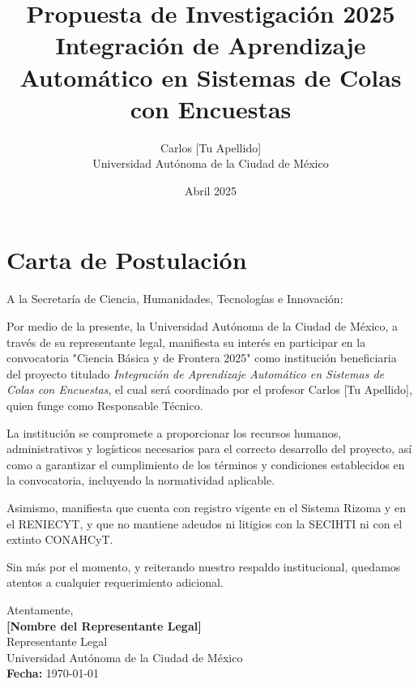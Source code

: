 \documentclass[12pt]{article}
\title{Propuesta de Investigación 2025\\Integración de Aprendizaje Automático en Sistemas de Colas con Encuestas}
\author{Carlos [Tu Apellido]\\Universidad Autónoma de la Ciudad de México}
\date{Abril 2025}
\begin{document}
\maketitle


\section*{Carta de Postulación}
A la Secretaría de Ciencia, Humanidades, Tecnologías e Innovación:

Por medio de la presente, la Universidad Autónoma de la Ciudad de México, a través de su representante legal, manifiesta su interés en participar en la convocatoria "Ciencia Básica y de Frontera 2025" como institución beneficiaria del proyecto titulado \textit{Integración de Aprendizaje Automático en Sistemas de Colas con Encuestas}, el cual será coordinado por el profesor Carlos [Tu Apellido], quien funge como Responsable Técnico.

La institución se compromete a proporcionar los recursos humanos, administrativos y logísticos necesarios para el correcto desarrollo del proyecto, así como a garantizar el cumplimiento de los términos y condiciones establecidos en la convocatoria, incluyendo la normatividad aplicable.

Asimismo, manifiesta que cuenta con registro vigente en el Sistema Rizoma y en el RENIECYT, y que no mantiene adeudos ni litigios con la SECIHTI ni con el extinto CONAHCyT.

Sin más por el momento, y reiterando nuestro respaldo institucional, quedamos atentos a cualquier requerimiento adicional.

\vspace{1cm}
\noindent Atentamente,\\[0.3cm]
\textbf{[Nombre del Representante Legal]}\\
Representante Legal\\
Universidad Autónoma de la Ciudad de México\\
\textbf{Fecha:} \today
\end{document}
